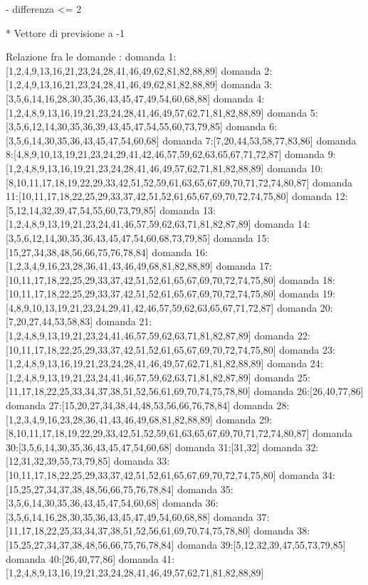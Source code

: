- differenza <= 2

* Vettore di previsione a -1

Relazione fra le domande :
domanda 1:[1,2,4,9,13,16,21,23,24,28,41,46,49,62,81,82,88,89]
domanda 2:[1,2,4,9,13,16,21,23,24,28,41,46,49,62,81,82,88,89]
domanda 3:[3,5,6,14,16,28,30,35,36,43,45,47,49,54,60,68,88]
domanda 4:[1,2,4,8,9,13,16,19,21,23,24,28,41,46,49,57,62,71,81,82,88,89]
domanda 5:[3,5,6,12,14,30,35,36,39,43,45,47,54,55,60,73,79,85]
domanda 6:[3,5,6,14,30,35,36,43,45,47,54,60,68]
domanda 7:[7,20,44,53,58,77,83,86]
domanda 8:[4,8,9,10,13,19,21,23,24,29,41,42,46,57,59,62,63,65,67,71,72,87]
domanda 9:[1,2,4,8,9,13,16,19,21,23,24,28,41,46,49,57,62,71,81,82,88,89]
domanda 10:[8,10,11,17,18,19,22,29,33,42,51,52,59,61,63,65,67,69,70,71,72,74,80,87]
domanda 11:[10,11,17,18,22,25,29,33,37,42,51,52,61,65,67,69,70,72,74,75,80]
domanda 12:[5,12,14,32,39,47,54,55,60,73,79,85]
domanda 13:[1,2,4,8,9,13,19,21,23,24,41,46,57,59,62,63,71,81,82,87,89]
domanda 14:[3,5,6,12,14,30,35,36,43,45,47,54,60,68,73,79,85]
domanda 15:[15,27,34,38,48,56,66,75,76,78,84]
domanda 16:[1,2,3,4,9,16,23,28,36,41,43,46,49,68,81,82,88,89]
domanda 17:[10,11,17,18,22,25,29,33,37,42,51,52,61,65,67,69,70,72,74,75,80]
domanda 18:[10,11,17,18,22,25,29,33,37,42,51,52,61,65,67,69,70,72,74,75,80]
domanda 19:[4,8,9,10,13,19,21,23,24,29,41,42,46,57,59,62,63,65,67,71,72,87]
domanda 20:[7,20,27,44,53,58,83]
domanda 21:[1,2,4,8,9,13,19,21,23,24,41,46,57,59,62,63,71,81,82,87,89]
domanda 22:[10,11,17,18,22,25,29,33,37,42,51,52,61,65,67,69,70,72,74,75,80]
domanda 23:[1,2,4,8,9,13,16,19,21,23,24,28,41,46,49,57,62,71,81,82,88,89]
domanda 24:[1,2,4,8,9,13,19,21,23,24,41,46,57,59,62,63,71,81,82,87,89]
domanda 25:[11,17,18,22,25,33,34,37,38,51,52,56,61,69,70,74,75,78,80]
domanda 26:[26,40,77,86]
domanda 27:[15,20,27,34,38,44,48,53,56,66,76,78,84]
domanda 28:[1,2,3,4,9,16,23,28,36,41,43,46,49,68,81,82,88,89]
domanda 29:[8,10,11,17,18,19,22,29,33,42,51,52,59,61,63,65,67,69,70,71,72,74,80,87]
domanda 30:[3,5,6,14,30,35,36,43,45,47,54,60,68]
domanda 31:[31,32]
domanda 32:[12,31,32,39,55,73,79,85]
domanda 33:[10,11,17,18,22,25,29,33,37,42,51,52,61,65,67,69,70,72,74,75,80]
domanda 34:[15,25,27,34,37,38,48,56,66,75,76,78,84]
domanda 35:[3,5,6,14,30,35,36,43,45,47,54,60,68]
domanda 36:[3,5,6,14,16,28,30,35,36,43,45,47,49,54,60,68,88]
domanda 37:[11,17,18,22,25,33,34,37,38,51,52,56,61,69,70,74,75,78,80]
domanda 38:[15,25,27,34,37,38,48,56,66,75,76,78,84]
domanda 39:[5,12,32,39,47,55,73,79,85]
domanda 40:[26,40,77,86]
domanda 41:[1,2,4,8,9,13,16,19,21,23,24,28,41,46,49,57,62,71,81,82,88,89]
